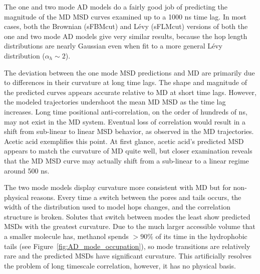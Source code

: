 \documentclass[journal=jctcce,manuscript=article]{achemso}
\begin{document}
  The one and two mode AD models do a fairly good job of predicting the
  magnitude of the MD MSD curves examined up to a 1000 ns time lag. In most
  cases, both the Brownian (sFBMcut) and L\'evy (sFLMcut) versions of both the
  one and two mode AD models give very similar results, 
  because  
  the hop length distributions are nearly Gaussian even when fit to a more general
  L\'evy distribution ($\alpha_h \sim 2$). 
  
  The deviation between the one mode MSD predictions and MD are primarily due
  to differences in their curvature at long time lags. The shape and magnitude
  of the predicted curves appears accurate relative to MD at short time lags.
  However, the modeled trajectories undershoot the mean MD MSD as the time lag
  increases. Long time positional anti-correlation, on the order of hundreds of
  ns, may not exist in the MD system. Eventual loss of correlation would result 
  in a shift from sub-linear to linear MSD behavior, as observed in the MD 
  trajectories. Acetic acid exemplifies this point. At first glance, acetic acid's
  predicted MSD appears to match the curvature of MD quite well, but closer 
  examination reveals that
  the MD MSD curve may actually shift from a sub-linear to a linear regime around
  500 ns.
  
  The two mode models display curvature more consistent with MD but for
  non-physical reasons. Every time a switch between the pores and tails occurs,
  the width of the distribution used to model hops changes, and the correlation structure is broken. 
  Solutes that switch between modes the least show
  predicted MSDs with the greatest curvature. Due to the much larger
  accessible volume that a smaller molecule has, methanol spends $>90\%$ of its
  time in the hydrophobic tails (see Figure~\ref{fig:AD_mode_occupation}), so
  mode transitions are relatively rare and the predicted MSDs have significant
  curvature. This artificially resolves the problem of long timescale
  correlation, however, it has no physical basis.
  
\end{document}
